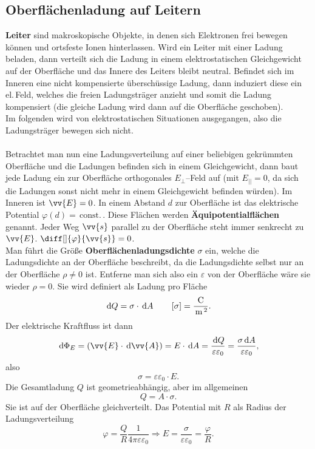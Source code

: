 \subsection{Oberflächenladung auf Leitern}
\textbf{Leiter} sind makroskopische Objekte, in denen sich Elektronen frei bewegen können und ortsfeste Ionen hinterlassen. Wird ein Leiter mit einer Ladung \glqq beladen\grqq{}, dann verteilt sich die Ladung in einem elektrostatischen Gleichgewicht auf der Oberfläche und das Innere des Leiters bleibt neutral. Befindet sich im Inneren eine nicht kompensierte überschüssige Ladung, dann induziert diese ein el.\,Feld, welches die freien Ladungsträger anzieht und somit die Ladung kompensiert (die gleiche Ladung wird dann auf die Oberfläche geschoben).\\\indent
Im folgenden wird von elektrostatischen Situationen ausgegangen, also die Ladungsträger bewegen sich nicht.\\\\\indent
Betrachtet man nun eine Ladungsverteilung auf einer beliebigen gekrümmten Oberfläche und die Ladungen befinden sich in einem Gleichgewicht, dann baut jede Ladung ein zur Oberfläche orthogonales $E_{\perp}$--Feld auf (mit $E_{||}=0$, da sich die Ladungen sonst nicht mehr in einem Gleichgewicht befinden würden). Im Inneren ist $\vv{E}=0$. In einem Abstand $d$ zur Oberfläche ist das elektrische Potential $\varphi \left(d\right)=\,\text{const.}\,$. Diese Flächen werden \textbf{Äquipotentialflächen} genannt. Jeder Weg $\vv{s}$ parallel zu der Oberfläche steht immer senkrecht zu $\vv{E}$. $\diff[]{\varphi }{\vv{s}}=0$.\\\indent
Man führt die Größe \textbf{Oberflächenladungsdichte} $\sigma $ ein, welche die Ladungsdichte an der Oberfläche beschreibt, da die Ladungsdichte selbst nur an der Oberfläche $\rho \neq 0$ ist. Entferne man sich also ein $\varepsilon $ von der Oberfläche wäre sie wieder $\rho =0$. Sie wird definiert als Ladung pro Fläche
\[ 
        \,\text{d} Q=\sigma \cdot \,\text{d} A\qquad \left[\sigma \right]=\dfrac{\,\text{C}\,}{\,\text{m}\,^2}
.\] 
Der elektrische Kraftfluss ist dann
\[ 
        \td \Phi _E=\left(\vv{E}\cdot \td \vv{A}\right)=E\cdot \td A=\dfrac{\td Q}{\varepsilon \varepsilon _0}=\dfrac{\sigma \td A}{\varepsilon \varepsilon _0}
,\] 
also
\[ 
        \sigma =\varepsilon \varepsilon _0\cdot E
.\] 
Die Gesamtladung $Q$ ist geometrieabhängig, aber im allgemeinen
\[ 
        Q=A\cdot \sigma 
.\] 
Sie ist auf der Oberfläche gleichverteilt. Das Potential mit $R$ als Radius der Ladungsverteilung
\[ 
        \varphi =\dfrac{Q}{R}\dfrac{1}{4\pi \varepsilon \varepsilon _0}\Rightarrow E=\dfrac{\sigma }{\varepsilon \varepsilon _0}=\dfrac{\varphi }{R}
.\] 
